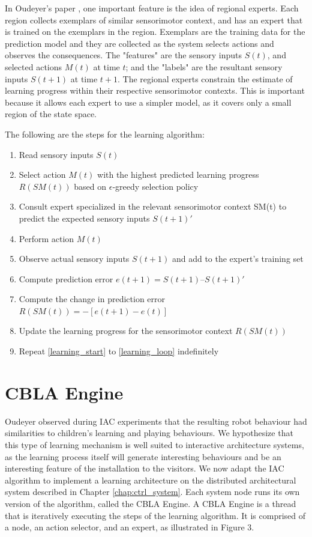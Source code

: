 In Oudeyer's paper \cite{Oudeyer2007}, one important feature is the idea of regional experts. Each region collects exemplars of similar sensorimotor context, and has an expert that is trained on the exemplars in the region. Exemplars are the training data for the prediction model and they are collected as the system selects actions and observes the consequences. The "features" are the sensory inputs $S(t)$, and selected actions $M(t)$ at time $t$; and the "labels" are the resultant sensory inputs $S(t+1)$ at time $t+1$. The regional experts constrain the estimate of learning progress within their respective sensorimotor contexts. This is important because it allows each expert to use a simpler model, as it covers only a small region of the state space.  

The following are the steps for the learning algorithm:

\begin{enumerate}
	\item \label{learning_start} Read sensory inputs $S(t)$
	\item Select action $M(t)$ with the highest predicted learning progress $R(SM(t))$ based on $\epsilon$-greedy selection policy
	\item Consult expert specialized in the relevant sensorimotor context SM(t) to predict the expected sensory inputs $S(t+1)'$
	\item Perform action $M(t)$
	\item Observe actual sensory inputs $S(t+1)$ and add to the expert’s training set
	\item Compute prediction error $e(t+1) = S(t+1) – S(t+1)'$
	\item Compute the change in prediction error $R(SM(t)) = -[e(t+1) - e(t)]$
	\item Update the learning progress for the sensorimotor context $R(SM(t))$
	\item \label{learning_loop} Repeat \ref{learning_start} to \ref{learning_loop} indefinitely
\end{enumerate}
	

\section{CBLA Engine}

Oudeyer \cite{Oudeyer2005} observed during IAC experiments that the resulting robot behaviour had similarities to children's learning and playing behaviours. We hypothesize that this type of learning mechanism is well suited to interactive architecture systems, as the learning process itself will generate interesting behaviours and be an interesting feature of the installation to the visitors. We now adapt the IAC algorithm \cite{Oudeyer2007} to implement a learning architecture on the distributed architectural system described in Chapter \ref{chap:ctrl_system}. Each system node runs its own version of the algorithm, called the CBLA Engine. A CBLA Engine is a thread that is iteratively executing the steps of the learning algorithm. It is comprised of a node, an action selector, and an expert, as illustrated in Figure 3. 

